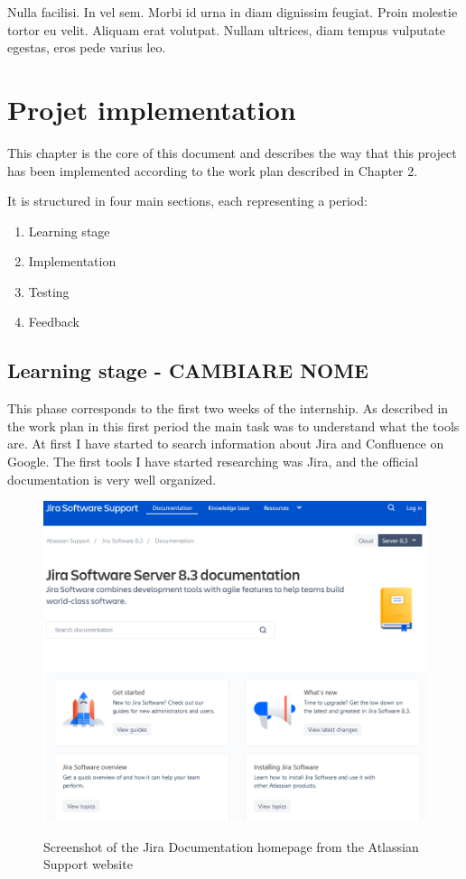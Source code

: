 \begin{savequote}[75mm]
Nulla facilisi. In vel sem. Morbi id urna in diam dignissim feugiat. Proin molestie tortor eu velit. Aliquam erat volutpat. Nullam ultrices, diam tempus vulputate egestas, eros pede varius leo.
\end{savequote}

\chapter{Projet implementation}

This chapter is the core of this document and describes the way that this project has been implemented according to the work plan described in Chapter 2.

It is structured in four main sections, each representing a period:
\begin{enumerate}
	\item Learning stage
	\item Implementation
	\item Testing
	\item Feedback
\end{enumerate}

\section{Learning stage - CAMBIARE NOME}

	This phase corresponds to the first two weeks of the internship.
	As described in the work plan in this first period the main task was to understand what the tools are.
	At first I have started to search information about Jira and Confluence on Google.
	The first tools I have started researching was Jira, and the official documentation is very well organized.
	\begin{figure}[H]
		\centering
		\includegraphics[width=1\textwidth]{resources/jira_documentation}\\
		\caption{Screenshot of the Jira Documentation homepage from the Atlassian Support website}
	\end{figure}
	
